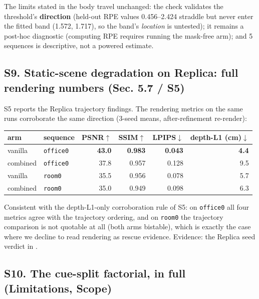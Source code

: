 The limits stated in the body travel unchanged: the check validates the threshold's \textbf{direction} (held-out RPE values 0.456--2.424 straddle but never enter the fitted band (1.572, 1.717), so the band's \emph{location} is untested); it remains a post-hoc diagnostic (computing RPE requires running the mask-free arm); and 5 sequences is descriptive, not a powered estimate.




\subsection{S9. Static-scene degradation on Replica: full rendering numbers (Sec. 5.7 / S5)}


S5 reports the Replica trajectory findings. The rendering metrics on the same runs corroborate the same direction (3-seed means, after-refinement re-render):


\begin{table}[t]\centering\scriptsize\setlength{\tabcolsep}{3.5pt}
\begin{tabular}{llrrrr}\toprule
arm & sequence & PSNR$\uparrow$ & SSIM$\uparrow$ & LPIPS$\downarrow$ & depth-L1 (cm)$\downarrow$ \\ \midrule
vanilla & \texttt{office0} & \textbf{43.0} & \textbf{0.983} & \textbf{0.043} & \textbf{4.4} \\
combined & \texttt{office0} & 37.8 & 0.957 & 0.128 & 9.5 \\
vanilla & \texttt{room0} & 35.5 & 0.956 & 0.078 & 5.7 \\
combined & \texttt{room0} & 35.0 & 0.949 & 0.098 & 6.3 \\
\bottomrule\end{tabular}\end{table}

Consistent with the depth-L1-only corroboration rule of S5: on \texttt{office0} all four metrics agree with the trajectory ordering, and on \texttt{room0} the trajectory comparison is not quotable at all (both arms bistable), which is exactly the case where we decline to read rendering as rescue evidence. Evidence: the Replica seed verdict in .




\subsection{S10. The cue-split factorial, in full (Limitations, Scope)}


